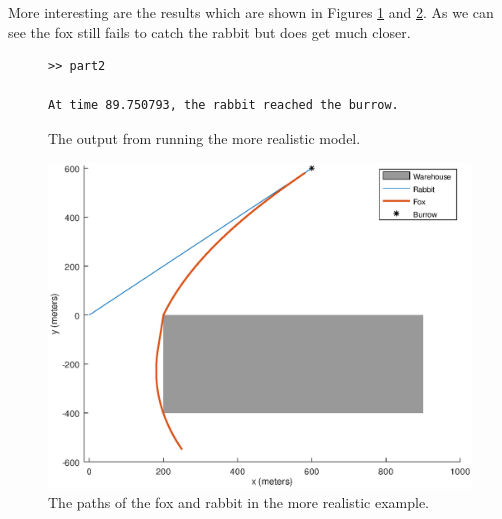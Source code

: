 More interesting are the results which are shown in Figures \ref{output:complex} and \ref{fig:realisticModel}. As we can see the fox still fails to catch the rabbit but does get much closer.

 \begin{figure}[h]
 \caption{The output from running the more realistic model.}
 \label{output:complex}
 \begin{verbatim}
>> part2

At time 89.750793, the rabbit reached the burrow.

 \end{verbatim}
 \end{figure}

\begin{figure}[!hb]
\centering

   \caption{The paths of the fox and rabbit in the more realistic example.}
   \includegraphics[scale=0.5]{realisticModel.eps}

      \label{fig:realisticModel}
\end{figure}





